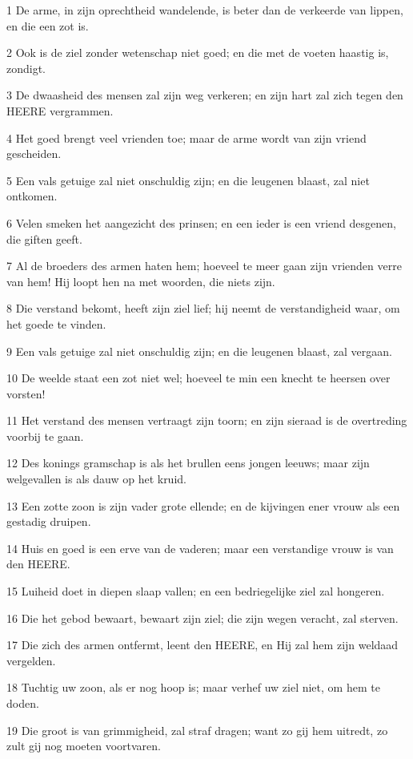 \par 1 De arme, in zijn oprechtheid wandelende, is beter dan de verkeerde van lippen, en die een zot is.
\par 2 Ook is de ziel zonder wetenschap niet goed; en die met de voeten haastig is, zondigt.
\par 3 De dwaasheid des mensen zal zijn weg verkeren; en zijn hart zal zich tegen den HEERE vergrammen.
\par 4 Het goed brengt veel vrienden toe; maar de arme wordt van zijn vriend gescheiden.
\par 5 Een vals getuige zal niet onschuldig zijn; en die leugenen blaast, zal niet ontkomen.
\par 6 Velen smeken het aangezicht des prinsen; en een ieder is een vriend desgenen, die giften geeft.
\par 7 Al de broeders des armen haten hem; hoeveel te meer gaan zijn vrienden verre van hem! Hij loopt hen na met woorden, die niets zijn.
\par 8 Die verstand bekomt, heeft zijn ziel lief; hij neemt de verstandigheid waar, om het goede te vinden.
\par 9 Een vals getuige zal niet onschuldig zijn; en die leugenen blaast, zal vergaan.
\par 10 De weelde staat een zot niet wel; hoeveel te min een knecht te heersen over vorsten!
\par 11 Het verstand des mensen vertraagt zijn toorn; en zijn sieraad is de overtreding voorbij te gaan.
\par 12 Des konings gramschap is als het brullen eens jongen leeuws; maar zijn welgevallen is als dauw op het kruid.
\par 13 Een zotte zoon is zijn vader grote ellende; en de kijvingen ener vrouw als een gestadig druipen.
\par 14 Huis en goed is een erve van de vaderen; maar een verstandige vrouw is van den HEERE.
\par 15 Luiheid doet in diepen slaap vallen; en een bedriegelijke ziel zal hongeren.
\par 16 Die het gebod bewaart, bewaart zijn ziel; die zijn wegen veracht, zal sterven.
\par 17 Die zich des armen ontfermt, leent den HEERE, en Hij zal hem zijn weldaad vergelden.
\par 18 Tuchtig uw zoon, als er nog hoop is; maar verhef uw ziel niet, om hem te doden.
\par 19 Die groot is van grimmigheid, zal straf dragen; want zo gij hem uitredt, zo zult gij nog moeten voortvaren.
